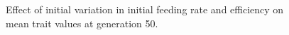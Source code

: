 \begin{figure}[p]
{  }
  \caption{Effect of initial variation in initial feeding rate and efficiency on mean trait values at generation 50.}
  \label{fig:ivar_fr_eff}
\end{figure}
